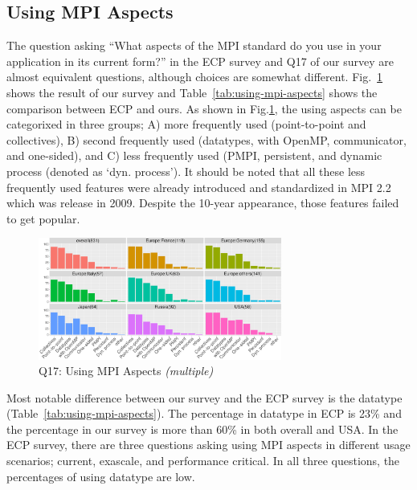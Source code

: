 \documentclass[conference,10pt,letterpaper]{IEEEtran}
\def\myquote#1{`#1'}
\begin{document}
\subsection{Using MPI Aspects}

The question asking ``What aspects of the MPI standard do you use in
your application in its current form?'' in the ECP survey and Q17 of
our survey are almost equivalent
questions, although choices are somewhat
different. Fig.~\ref{fig:using-mpi-aspects} shows the result of our 
survey and Table~\ref{tab:using-mpi-aspects} shows the comparison
between ECP and ours. As shown in Fig.\ref{fig:using-mpi-aspects}, the
using aspects can be categorixed in three groups; A) more frequently
used (point-to-point and collectives), B) second frequently used
(datatypes, with OpenMP, communicator, and one-sided), and C) less
frequently used (PMPI, persistent, and dynamic process (denoted as
\myquote{dyn. process}).
It should be noted that all these less frequently used features were
already introduced and standardized in MPI 2.2 which was release in
2009. Despite the 10-year appearance, those features failed to get
popular.  

\begin{figure}[htb]
  \begin{center}
    \includegraphics[width=8cm]{R-scripts/Q17.pdf}
    \caption{Q17: Using MPI Aspects {\it(multiple)}}
    \label{fig:using-mpi-aspects}
  \end{center}
\end{figure}

Most notable difference between our survey and the ECP survey is the
datatype (Table~\ref{tab:using-mpi-aspects}). The percentage in
datatype in ECP is 23\% and the percentage in our survey is more
than 60\% in both overall and USA. In the ECP survey, there are three
questions asking using MPI aspects in different usage scenarios; current,
exascale, and performance critical. In all three questions, the
percentages of using datatype are low.
\end{document}
